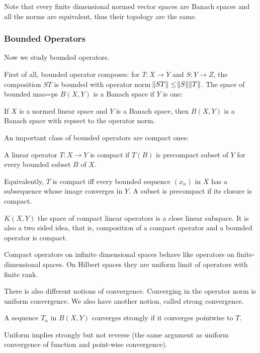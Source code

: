\documentclass[main.tex]{subfiles}
\begin{document}
Note that every finite dimensional normed vector spaces are Banach spaces and all the norms are equivalent, thus their topology are the same.

\subsubsection{Bounded Operators}
Now we study bounded operators. 

First of all, bounded operator composes: for $T: X \rightarrow Y$ and $S: Y \rightarrow Z$, the composition $ST$ is bounded with operator norm $\norm{ST} \leq \norm{S}\norm{T}$. 
The space of bounded mao=ps $B(X,Y)$ is a Banach space if $Y$ is one:
\begin{theorem}
If $X$ is a normed linear space and $Y$ is a Banach space, then $B(X,Y)$ is a Banach space with repsect to the operator norm.
\end{theorem}

An important class of bounded operators are compact ones:

\begin{definition}
A linear operator $T: X \rightarrow Y$ is compact if $T(B)$ is precompact subset of $Y$ for every bounded subset $B$ of $X$.
\end{definition}

Equivalently, $T$ is compact iff every bounded sequence $(x_n)$ in $X$ has a subsequence whose image converges in $Y$. A subset is precompact if its closure is compact. 

\begin{proposition}
$K(X,Y)$ the space of compact linear operators is a close linear subspace. It is also a two sided idea, that is, composition of a compact operator and a bounded operator is compact.
\end{proposition}

Compact operators on infinite dimensional spaces behave like operators on finite-dimensional spaces. On Hilbert spaces they are uniform limit of operators with finite rank.

There is also different notions of convergence. Converging in the operator norm is uniform convergence. We also have another notion, called strong convergence.

\begin{definition}
A sequence $T_n$ in $B(X,Y)$ converges strongly if it converges pointwise to $T$.
\end{definition}
Uniform implies strongly but not reverse (the same argument as uniform convergence of function and point-wise convergence).
\end{document}
